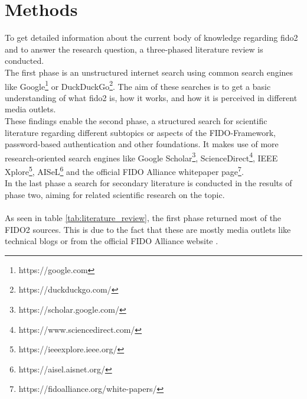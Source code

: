 
\section{Methods}
\label{sec:methods}


To get detailed information about the current body of knowledge regarding \ac{fido2} and to answer the research question, a three-phased literature review is conducted.\\
The first phase is an unstructured internet search using common search engines like Google\footnote{https://google.com} or DuckDuckGo\footnote{https://duckduckgo.com/}. The aim of these searches is to get a basic understanding of what \ac{fido2} is, how it works, and how it is perceived in different media outlets.\\
These findings enable the second phase, a structured search for scientific literature regarding different subtopics or aspects of the FIDO-Framework, password-based authentication and other foundations. It makes use of more research-oriented search engines like Google Scholar\footnote{https://scholar.google.com/}, ScienceDirect\footnote{https://www.sciencedirect.com/}, IEEE Xplore\footnote{https://ieeexplore.ieee.org/}, AISeL\footnote{https://aisel.aisnet.org/} and the official FIDO Alliance whitepaper page\footnote{https://fidoalliance.org/white-papers/}.\\
In the last phase a search for secondary literature is conducted in the results of phase two, aiming for related scientific research on the topic.\\
\\
As seen in table \ref{tab:literature_review}, the first phase returned most of the FIDO2 sources. This is due to the fact that these are mostly media outlets like technical blogs \citep{hunt2018b,leitner2019, chonng2018, ng2019, mingis2020} or from the official FIDO Alliance website \citep{fido2_overview,fido2_webauthn}.

